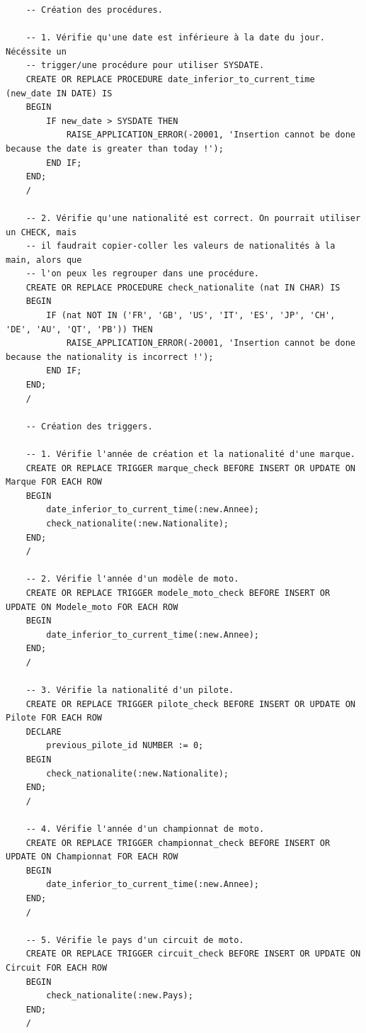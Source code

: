 \documentclass[12pt,a4paper]{article}
\newenvironment{code}{\captionsetup{type=listing}}{}
\begin{document}
\begin{code}
    \begin{verbatim}
    -- Création des procédures.

    -- 1. Vérifie qu'une date est inférieure à la date du jour. Nécéssite un
    -- trigger/une procédure pour utiliser SYSDATE.
    CREATE OR REPLACE PROCEDURE date_inferior_to_current_time (new_date IN DATE) IS
    BEGIN
        IF new_date > SYSDATE THEN
            RAISE_APPLICATION_ERROR(-20001, 'Insertion cannot be done because the date is greater than today !');
        END IF;
    END;
    /

    -- 2. Vérifie qu'une nationalité est correct. On pourrait utiliser un CHECK, mais
    -- il faudrait copier-coller les valeurs de nationalités à la main, alors que
    -- l'on peux les regrouper dans une procédure.
    CREATE OR REPLACE PROCEDURE check_nationalite (nat IN CHAR) IS
    BEGIN
        IF (nat NOT IN ('FR', 'GB', 'US', 'IT', 'ES', 'JP', 'CH', 'DE', 'AU', 'QT', 'PB')) THEN
            RAISE_APPLICATION_ERROR(-20001, 'Insertion cannot be done because the nationality is incorrect !');
        END IF;
    END;
    /

    -- Création des triggers.

    -- 1. Vérifie l'année de création et la nationalité d'une marque.
    CREATE OR REPLACE TRIGGER marque_check BEFORE INSERT OR UPDATE ON Marque FOR EACH ROW
    BEGIN
        date_inferior_to_current_time(:new.Annee);
        check_nationalite(:new.Nationalite);
    END;
    /

    -- 2. Vérifie l'année d'un modèle de moto.
    CREATE OR REPLACE TRIGGER modele_moto_check BEFORE INSERT OR UPDATE ON Modele_moto FOR EACH ROW
    BEGIN
        date_inferior_to_current_time(:new.Annee);
    END;
    /

    -- 3. Vérifie la nationalité d'un pilote.
    CREATE OR REPLACE TRIGGER pilote_check BEFORE INSERT OR UPDATE ON Pilote FOR EACH ROW
    DECLARE
        previous_pilote_id NUMBER := 0;
    BEGIN
        check_nationalite(:new.Nationalite);
    END;
    /

    -- 4. Vérifie l'année d'un championnat de moto.
    CREATE OR REPLACE TRIGGER championnat_check BEFORE INSERT OR UPDATE ON Championnat FOR EACH ROW
    BEGIN
        date_inferior_to_current_time(:new.Annee);
    END;
    /

    -- 5. Vérifie le pays d'un circuit de moto.
    CREATE OR REPLACE TRIGGER circuit_check BEFORE INSERT OR UPDATE ON Circuit FOR EACH ROW
    BEGIN
        check_nationalite(:new.Pays);
    END;
    /


\end{verbatim}
\end{code}
\end{document}
